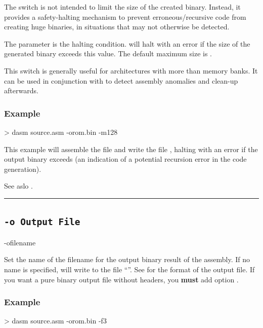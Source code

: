 \label{changelog:20200908optionm}

The  switch is not intended to limit the size of the created binary. Instead, it provides a safety-halting mechanism to prevent erroneous/recursive code from creating huge binaries, in situations that may not otherwise be detected.

The  parameter is the halting condition. \dasm will halt with an error if the size of the generated binary exceeds this value. The default maximum size is .

This switch is generally useful for architectures with more than  memory banks. It can be used in conjunction with  to detect assembly anomalies and clean-up afterwards.

\subsubsection{Example}
\begin{outputx}
> dasm source.asm -orom.bin -m128
\end{outputx}

This example will assemble the file  and write the file , halting with an error if the output binary exceeds  (an indication of a potential recursion error in the code generation).

See aslo .\\

\hrule


\subsection{\texttt{-o Output File}}
\label{flag:outputfile}

\begin{usage}
-ofilename
\end{usage}

Set the name of the filename for the output binary result of the assembly. If no name is specified, \dasm will write to the file ``''. See  for the format of the output file. If you want a pure binary output file without headers, you \textbf{must} add option .

\subsubsection{Example}
\begin{outputx}
> dasm source.asm -orom.bin -f3
\end{outputx}

